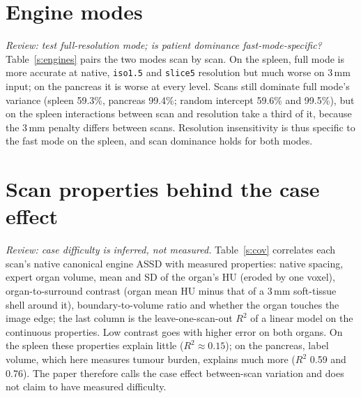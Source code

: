 \documentclass[conference]{IEEEtran}
\newcommand{\lvl}[1]{\texttt{#1}}
\newcommand{\mm}{\,mm\xspace}
\begin{document}
\begin{table}[!t]
\caption{Canonical and production ASSD (mm) under the Gaussian coarsening of the paper and under each variant, paired by scan; Dice G / V: Gaussian / variant.}
\label{s:coarse}
\centering\footnotesize

\end{table}

\section{Engine modes}
\emph{Review: test full-resolution mode; is patient dominance fast-mode-specific?} Table~\ref{s:engines} pairs the two modes scan by scan. On the spleen, full mode is more accurate at native, \lvl{iso1.5} and \lvl{slice5} resolution but much worse on 3\mm input; on the pancreas it is worse at every level. Scans still dominate full mode's variance (spleen 59.3\%, pancreas 99.4\%; random intercept 59.6\% and 99.5\%), but on the spleen interactions between scan and resolution take a third of it, because the 3\mm penalty differs between scans. Resolution insensitivity is thus specific to the fast mode on the spleen, and scan dominance holds for both modes.

\begin{table}[!t]
\caption{TotalSegmentator full against fast mode, paired by scan (ASSD in mm; full better: scans with lower full-mode ASSD).}
\label{s:engines}
\centering\footnotesize

\end{table}

\section{Scan properties behind the case effect}
\emph{Review: case difficulty is inferred, not measured.} Table~\ref{s:cov} correlates each scan's native canonical engine ASSD with measured properties: native spacing, expert organ volume, mean and SD of the organ's HU (eroded by one voxel), organ-to-surround contrast (organ mean HU minus that of a 3\mm soft-tissue shell around it), boundary-to-volume ratio and whether the organ touches the image edge; the last column is the leave-one-scan-out $R^2$ of a linear model on the continuous properties. Low contrast goes with higher error on both organs. On the spleen these properties explain little ($R^2\approx0.15$); on the pancreas, label volume, which here measures tumour burden, explains much more ($R^2$ 0.59 and 0.76). The paper therefore calls the case effect between-scan variation and does not claim to have measured difficulty.
\end{document}
